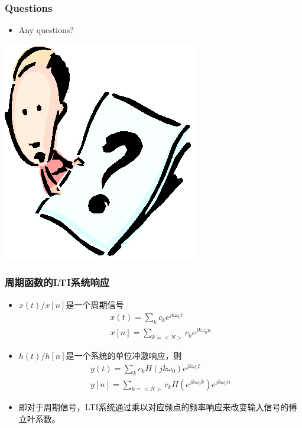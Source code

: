 \documentclass[CJKutf8,xcolor=pdftex,dvipsnames,table]{beamer}
\begin{document}
\begin{CJK*}{UTF8}{song}
  \begin{frame}
    \frametitle{Questions}
    \begin{itemize}
    \item Any questions?
    \end{itemize}
    \begin{center}
      \includegraphics[scale=.5]{question}
    \end{center}
  \end{frame}     
  
  \begin{frame}
    \frametitle{周期函数的LTI系统响应}
    \begin{itemize}
    \item $x(t)/x[n]$是一个周期信号
    \begin{align*}
    x(t) = \sum_k c_k e^{jk\omega_0 t} \\
    x[n] = \sum_{k=<N>} c_k e^{jk\omega_0 n}
    \end{align*}
	\item $h(t)/h[n]$是一个系统的单位冲激响应，则	
	\begin{align*}
	 y(t) = \sum_k c_k H(jk\omega_0) e^{jk\omega_0 t} \\
	 y[n] = \sum_{k=<N>} c_k H(e^{jk\omega_0 k}) e^{jk\omega_0 n}
	\end{align*}
    \item 即对于周期信号，LTI系统通过乘以对应频点的频率响应来改变输入信号的傅立叶系数。
    \end{itemize}
    
  \end{frame}            
     

\end{CJK*}
\end{document}
